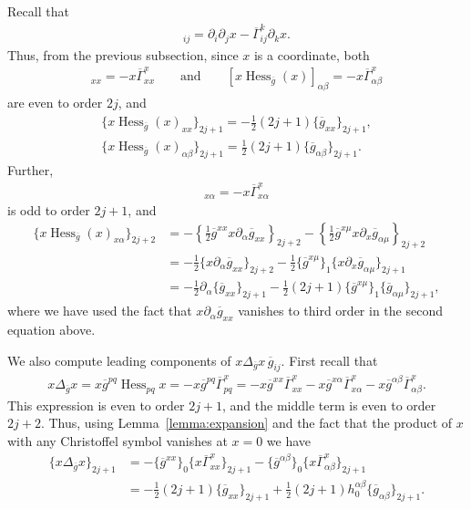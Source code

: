 \documentclass[11pt]{article}
\numberwithin{equation}{section}
\newcommand{\olg}{\overline{g}}
\newcommand{\olGamma}{\overline{\Gamma}}
\newcommand{\gbar}{\overline{g}}
\DeclareMathOperator{\hess}{Hess}
\begin{document}
Recall that
\begin{gather*}
 [\hess_{\olg} x]_{ij} = \partial_i \partial_j x - \olGamma_{ij}^k \partial_k x. \end{gather*}
Thus, from the previous subsection, since $x$ is a coordinate, both
\begin{gather*} [x \hess_{\olg}(x)]_{xx} = - x \olGamma_{xx}^x \qquad \mbox{and} \qquad [x \hess_{\olg}(x)]_{\alpha \beta} = - x \olGamma_{\alpha \beta}^x
\end{gather*}
are even to order $2j$, and
\begin{gather} \label{eqn:hess-asymp-xx}
\{x \hess_{\olg}(x)_{xx}\}_{2j+1} = -\frac{1}{2} (2j+1) \{\olg_{xx}\}_{2j+1}, \\
\{x \hess_{\olg}(x)_{\alpha \beta}\}_{2j+1} = \frac{1}{2} (2j+1) \{\olg_{\alpha \beta}\}_{2j+1}.\label{eqn:hess-asymp-ab}
\end{gather}
Further,
\begin{gather*}
 [x \hess_{\olg}(x)]_{x\alpha} = -x \olGamma_{x\alpha}^x
\end{gather*}
is odd to order $2j+1$, and
\begin{align}
 \{x \hess_{\olg}(x)_{x\alpha}\}_{2j+2} &= -\left\{\frac{1}{2}\olg^{xx} x \partial_{\alpha} \olg_{xx}\right\}_{2j+2} - \left\{ \frac{1}{2} \olg^{x\mu} x \partial_x \olg_{\alpha \mu} \right\}_{2j+2} \nonumber \\
 &= -\frac{1}{2} \{ x \partial_{\alpha} \olg_{xx} \}_{2j+2} - \frac{1}{2} \{ \olg^{x \mu} \}_1 \{ x \partial_x \olg_{\alpha \mu} \}_{2j+1} \nonumber \\
 &= -\frac{1}{2} \partial_{\alpha} \{\olg_{xx}\}_{2j+1} - \frac{1}{2}(2j+1)\{ \olg^{x \mu} \}_1 \{ \olg_{\alpha \mu}\}_{2j+1},\label{eqn:mixed-ref-1}
\end{align}
where we have used the fact that $x \partial_{\alpha} \olg_{xx}$ vanishes to third order in the second equation above.

We also compute leading components of $x \Delta_{\olg} x \, \gbar_{ij}$. First recall that
\begin{gather*}
x \Delta_{\olg} x = x \gbar^{pq} \hess_{pq} x =-x \gbar^{pq} \olGamma_{pq}^x = -x\gbar^{xx} \olGamma_{xx}^x - x\gbar^{x\alpha} \olGamma_{x\alpha}^x - x\gbar^{\alpha \beta} \olGamma_{\alpha \beta}^x.
\end{gather*}
This expression is even to order $2j+1$, and the middle term is even to order $2j+2$. Thus, using Lemma~\ref{lemma:expansion} and the fact that the product of $x$ with any Christoffel symbol vanishes at $x=0$ we have
\begin{align*}
 \{x \Delta_{\olg} x\}_{2j+1} &= -\{ \gbar^{xx}\}_0 \{ x \olGamma_{xx}^x\}_{2j+1} - \{ \gbar^{\alpha \beta}\}_0 \{ x\olGamma_{\alpha \beta}^x\}_{2j+1} \\
 &= -\frac{1}{2} (2j+1) \{\olg_{xx}\}_{2j+1} +\frac{1}{2} (2j+1) h_0^{\alpha \beta}\{\olg_{\alpha \beta}\}_{2j+1}.
\end{align*}
\end{document}
